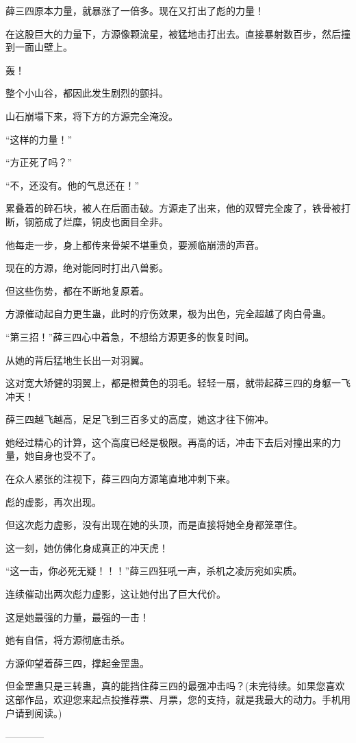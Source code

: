 \begin{this_body}
薛三四原本力量，就暴涨了一倍多。现在又打出了彪的力量！

在这股巨大的力量下，方源像颗流星，被猛地击打出去。直接暴射数百步，然后撞到一面山壁上。

轰！

整个小山谷，都因此发生剧烈的颤抖。

山石崩塌下来，将下方的方源完全淹没。

“这样的力量！”

“方正死了吗？”

“不，还没有。他的气息还在！”

累叠着的碎石块，被人在后面击破。方源走了出来，他的双臂完全废了，铁骨被打断，钢筋成了烂糜，铜皮也面目全非。

他每走一步，身上都传来骨架不堪重负，要濒临崩溃的声音。

现在的方源，绝对能同时打出八兽影。

但这些伤势，都在不断地复原着。

方源催动起自力更生蛊，此时的疗伤效果，极为出色，完全超越了肉白骨蛊。

“第三招！”薛三四心中着急，不想给方源更多的恢复时间。

从她的背后猛地生长出一对羽翼。

这对宽大矫健的羽翼上，都是橙黄色的羽毛。轻轻一扇，就带起薛三四的身躯一飞冲天！

薛三四越飞越高，足足飞到三百多丈的高度，她这才往下俯冲。

她经过精心的计算，这个高度已经是极限。再高的话，冲击下去后对撞出来的力量，她自身也受不了。

在众人紧张的注视下，薛三四向方源笔直地冲刺下来。

彪的虚影，再次出现。

但这次彪力虚影，没有出现在她的头顶，而是直接将她全身都笼罩住。

这一刻，她仿佛化身成真正的冲天虎！

“这一击，你必死无疑！！！”薛三四狂吼一声，杀机之凌厉宛如实质。

连续催动出两次彪力虚影，这让她付出了巨大代价。

这是她最强的力量，最强的一击！

她有自信，将方源彻底击杀。

方源仰望着薛三四，撑起金罡蛊。

但金罡蛊只是三转蛊，真的能挡住薛三四的最强冲击吗？(未完待续。如果您喜欢这部作品，欢迎您来起点投推荐票、月票，您的支持，就是我最大的动力。手机用户请到阅读。)

------------

\end{this_body}

